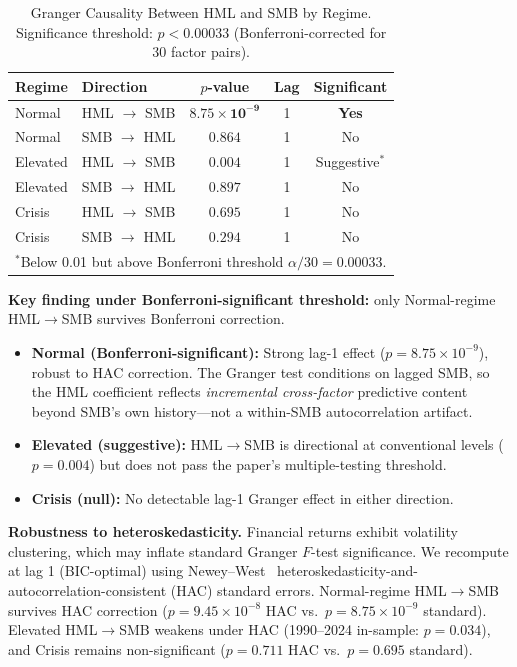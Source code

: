 \documentclass[sigconf,anonymous]{acmart}
\begin{document}
\begin{table}[t]
\centering
\caption{Granger Causality Between HML and SMB by Regime. Significance threshold:
$p < 0.00033$ (Bonferroni-corrected for 30 factor pairs).}
\label{tab:main}
\small
\begin{tabular}{llccc}
\toprule
Regime & Direction & $p$-value & Lag & Significant \\
\midrule
Normal & HML $\to$ SMB & $\mathbf{8.75 \times 10^{-9}}$ & 1 & \textbf{Yes} \\
Normal & SMB $\to$ HML & $0.864$ & 1 & No \\
\midrule
Elevated & HML $\to$ SMB & $0.004$ & 1 & Suggestive$^*$ \\
Elevated & SMB $\to$ HML & $0.897$ & 1 & No \\
\midrule
Crisis & HML $\to$ SMB & $0.695$ & 1 & No \\
Crisis & SMB $\to$ HML & $0.294$ & 1 & No \\
\bottomrule
\multicolumn{5}{l}{\footnotesize $^*$Below 0.01 but above Bonferroni threshold $\alpha/30 = 0.00033$.}
\end{tabular}
\end{table}

\textbf{Key finding under Bonferroni-significant threshold:} only Normal-regime
HML$\to$SMB survives Bonferroni correction.
\begin{itemize}
    \item \textbf{Normal (Bonferroni-significant):} Strong lag-1 effect
    ($p = 8.75 \times 10^{-9}$), robust to HAC correction. The Granger test conditions
    on lagged SMB, so the HML coefficient reflects \emph{incremental cross-factor}
    predictive content beyond SMB's own history---not a within-SMB autocorrelation artifact.
    \item \textbf{Elevated (suggestive):} HML$\to$SMB is directional at
    conventional levels ($p = 0.004$) but does not pass the paper's
    multiple-testing threshold.
    \item \textbf{Crisis (null):} No detectable lag-1 Granger effect in either
    direction.
\end{itemize}

\textbf{Robustness to heteroskedasticity.}
Financial returns exhibit volatility clustering, which may inflate standard Granger
$F$-test significance. We recompute at lag 1 (BIC-optimal) using Newey--West~\cite{newey1987simple}
heteroskedasticity-and-autocorrelation-consistent (HAC) standard errors.
Normal-regime HML$\to$SMB survives HAC correction
($p = 9.45 \times 10^{-8}$ HAC vs.\ $p = 8.75 \times 10^{-9}$ standard).
Elevated HML$\to$SMB weakens under HAC (1990--2024 in-sample: $p = 0.034$), and Crisis remains
non-significant ($p = 0.711$ HAC vs.\ $p = 0.695$ standard).
\end{document}
